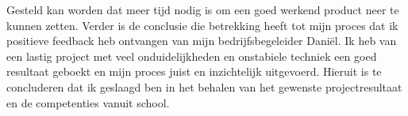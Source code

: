 Gesteld kan worden dat meer tijd nodig is om een goed werkend product neer te kunnen zetten. Verder is de conclusie die betrekking heeft tot mijn proces dat ik positieve feedback heb ontvangen van mijn bedrijfsbegeleider Daniël. Ik heb van een lastig project met veel onduidelijkheden en onstabiele techniek een goed resultaat geboekt en mijn proces juist en inzichtelijk uitgevoerd. Hieruit is te concluderen dat ik geslaagd ben in het behalen van het gewenste projectresultaat en de competenties vanuit school.
